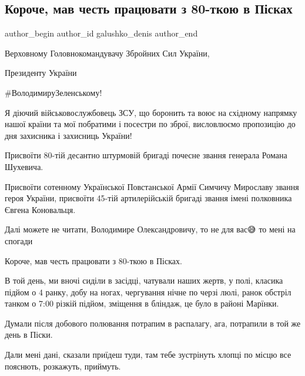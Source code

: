  
 
 
 
 

\subsection{Короче, мав честь працювати з 80-ткою в Пісках}
\label{sec:13_10_2022.fb.galushko_denis.1.koroche__mav_chest_p}

\ifcmt
 author_begin
   author_id galushko_denis
 author_end
\fi

Верховному Головнокомандувачу Збройних Сил України, 

Президенту України 

\#ВолодимируЗеленському!

Я діючий військовослужбовець ЗСУ, що боронить та воює на східному напрямку
нашої країни та мої побратими і посестри по зброї, висловлюємо  пропозицію до
дня захисника і захисниць України!

Присвоїти 80-тій десантно штурмовій бригаді почесне звання генерала Романа
Шухевича.

Присвоїти сотенному Української Повстанської Армії Симчичу Мирославу звання
героя України, присвоїти 45-тій артилерійській бригаді звання імені полковника
Євгена Коновальця. 

Далі можете не читати, Володимире Олександровичу, то не для вас😅 то мені на
спогади

Короче, мав честь працювати з 80-ткою в Пісках.

В той день, ми вночі сиділи в засідці, чатували наших жертв, у полі, класика
підйом о 4 ранку, добу на ногах, чергування нічне по черзі люлі, ранок обстріл
танком о 7:00  різкій підйом, зміщення в бліндаж, це було в районі Марїнки.

Думали після добового полювання  потрапим в распалагу, ага, потрапили в той же
день в Піски.

Дали мені дані, сказали приїдеш туди, там тебе зустрінуть хлопці по місцю все
пояснють, розкажуть, приймуть. 

